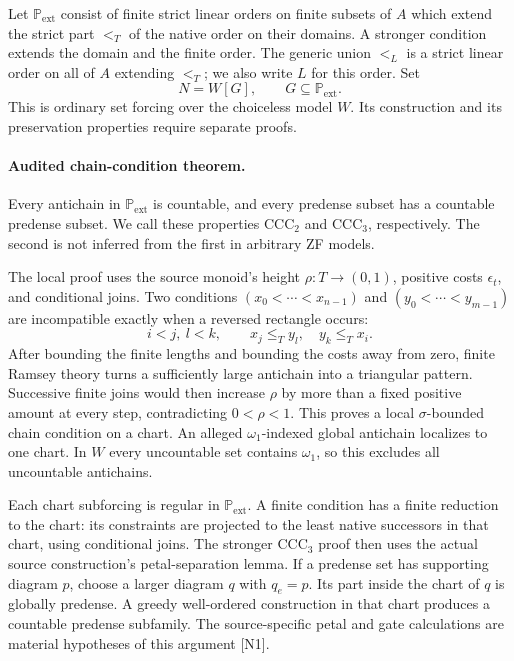 Let $\mathbb P_{\mathrm{ext}}$ consist of finite strict linear orders on
finite subsets of $A$ which extend the strict part $<_T$ of the native order on their domains.
A stronger condition extends the domain and the finite order.  The
generic union $<_L$ is a strict linear order on all of $A$ extending $<_T$; we also write $L$ for this order.
Set
\[
              N=W[G],\qquad G\subseteq\mathbb P_{\mathrm{ext}}.
\]
This is ordinary set forcing over the choiceless model $W$.  Its
construction and its preservation properties require separate proofs.

\paragraph{Audited chain-condition theorem.}
Every antichain in $\mathbb P_{\mathrm{ext}}$ is countable, and every
predense subset has a countable predense subset.  We call these
properties $\mathrm{CCC}_2$ and $\mathrm{CCC}_3$, respectively.  The
second is not inferred from the first in arbitrary ZF models.

The local proof uses the source monoid's height $\rho:T\to(0,1)$,
positive costs $\epsilon_t$, and conditional joins.  Two conditions
$(x_0<\cdots<x_{n-1})$ and $(y_0<\cdots<y_{m-1})$ are incompatible
exactly when a reversed rectangle occurs:
\[
 i<j,\ l<k,\qquad x_j\leq_T y_l,
                         \quad y_k\leq_T x_i.
\]
After bounding the finite lengths and bounding the costs away from zero,
finite Ramsey theory turns a sufficiently large antichain into a
triangular pattern.  Successive finite joins would then increase
$\rho$ by more than a fixed positive amount at every step, contradicting
$0<\rho<1$.  This proves a local $\sigma$-bounded chain condition on a
chart.  An alleged $\omega_1$-indexed global antichain localizes to one
chart.  In $W$ every uncountable set contains $\omega_1$, so this excludes
all uncountable antichains.

Each chart subforcing is regular in $\mathbb P_{\mathrm{ext}}$.
A finite condition has a finite reduction to the chart: its constraints
are projected to the least native successors in that chart, using
conditional joins.  The stronger $\mathrm{CCC}_3$ proof then uses the
actual source construction's petal-separation lemma.  If a predense set
has supporting diagram $p$, choose a larger diagram $q$ with $q_e=p$.
Its part inside the chart of $q$ is globally predense.  A greedy
well-ordered construction in that chart produces a countable predense
subfamily.  The source-specific petal and gate calculations are material
hypotheses of this argument [N1].

